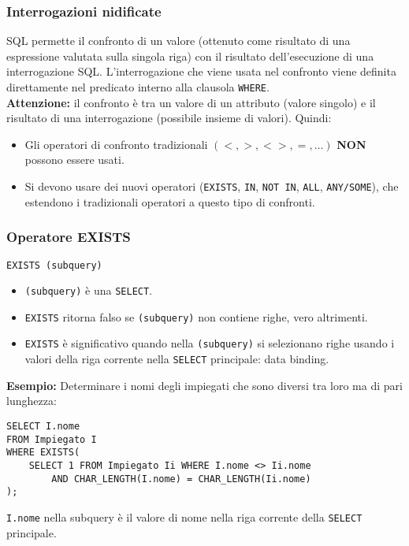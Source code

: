\documentclass[a4paper, 10pt, titlepage]{article}
\begin{document}
	\subsubsection{Interrogazioni nidificate}
		SQL permette il confronto di un valore (ottenuto come risultato di una
		espressione valutata sulla singola riga) con il risultato dell’esecuzione di
		una interrogazione SQL. L’interrogazione che viene usata nel confronto viene definita
		direttamente nel predicato interno alla clausola \lstinline|WHERE|. \\
		\textbf{Attenzione: }il confronto è tra un valore di un attributo (valore singolo) e
		il risultato di una interrogazione (possibile insieme di valori). Quindi:
		\begin{itemize}
				\item Gli operatori di confronto tradizionali $ (<, >, <>, =, \dots) $ \textbf{NON} possono	essere usati.
				\item Si devono usare dei nuovi operatori (\lstinline|EXISTS|, \lstinline|IN|, 
				\lstinline|NOT IN|, \lstinline|ALL|, \lstinline|ANY/SOME|), che estendono i tradizionali
				operatori a questo tipo di confronti.
			\end{itemize}
			
	\subsubsection*{Operatore EXISTS}
		\begin{lstlisting}
EXISTS (subquery)
		\end{lstlisting}
		\begin{itemize}
		\item \lstinline|(subquery)| è una \lstinline|SELECT|.
		\item \lstinline|EXISTS| ritorna falso se \lstinline|(subquery)| non contiene righe, vero altrimenti.
		\item \lstinline|EXISTS| è significativo quando nella \lstinline|(subquery)| si selezionano righe
			usando i valori della riga corrente nella \lstinline|SELECT| principale: data binding.
		\end{itemize}
			\medskip
			\textbf{Esempio:} Determinare i nomi degli impiegati che sono diversi tra loro ma di pari lunghezza:
			\begin{lstlisting}[tabsize=4]
SELECT I.nome
FROM Impiegato I
WHERE EXISTS(
    SELECT 1 FROM Impiegato Ii WHERE I.nome <> Ii.nome
		AND CHAR_LENGTH(I.nome) = CHAR_LENGTH(Ii.nome)
);
			\end{lstlisting}
			\lstinline|I.nome| nella subquery è il valore di nome nella riga corrente della \lstinline|SELECT| principale.
			
\end{document}
